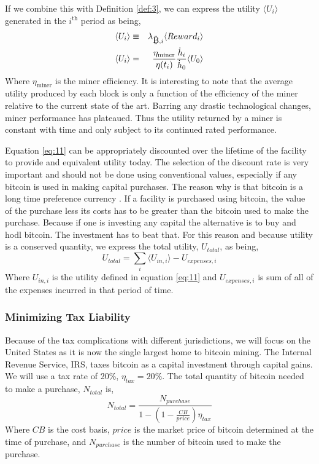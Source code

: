 \documentclass[runningheads]{llncs}
\def\bitcoin{
    \leavevmode
    \vtop{\offinterlineskip %
    \setbox0=\hbox{B}
    \setbox2=\hbox to\wd0{\hfil\hskip-.03em
    \vrule height .3ex width .15ex\hskip .08em
    \vrule height .3ex width .15ex\hfil}
    \vbox{\copy2\box0}\box2}
}
\begin{document}
If we combine this with Definition \ref{def:3}, we can express the utility $\langle U_i \rangle$ generated in the $i^{\mbox{th}}$ period as being,
\begin{eqnarray}
    \langle U_i \rangle &\equiv& \lambda_{\bitcoin, i} \langle Reward_i \rangle \\
    \langle U_i \rangle &=& \frac{\eta_{\mathrm{miner}}}{\eta(t_i)} \frac{\dot{h}_i}{\dot{h}_0} \langle U_0 \rangle \label{eq:11}
\end{eqnarray}
Where $\eta_{\mathrm{miner}}$ is the miner efficiency.
It is interesting to note that the average utility produced by each block is only a function of the efficiency of the miner relative to the current state of the art.
Barring any drastic technological changes, miner performance has plateaued.
Thus the utility returned by a miner is constant with time and only subject to its continued rated performance.

Equation \ref{eq:11} can be appropriately discounted over the lifetime of the facility to provide and equivalent utility today.
The selection of the discount rate is very important and should not be done using conventional values, especially if any bitcoin is used in making capital purchases.
The reason why is that bitcoin is a long time preference currency \cite{ammous2018bitcoin}.
If a facility is purchased using bitcoin, the value of the purchase less its costs has to be greater than the bitcoin used to make the purchase.
Because if one is investing any capital the alternative is to buy and hodl bitcoin.
The investment has to beat that.
For this reason and because utility is a conserved quantity, we express the total utility, $U_{total}$, as being,
\begin{equation}
    U_{total} = \sum_i \langle U_{in,i} \rangle - U_{expenses,i}\label{eq:12}
\end{equation}
Where $U_{in,i}$ is the utility defined in equation \ref{eq:11} and $U_{expenses,i}$ is sum of all of the expenses incurred in that period of time.

\subsubsection{Minimizing Tax Liability}
Because of the tax complications with different jurisdictions, we will focus on the United States as it is now the single largest home to bitcoin mining.
The Internal Revenue Service, IRS, taxes bitcoin as a capital investment through capital gains.
We will use a tax rate of 20\%, $\eta_{tax} = 20\%$.
The total quantity of bitcoin needed to make a purchase, $N_{total}$ is,
\begin{equation}
    N_{total} = \frac{N_{purchase}}{1-(1-\frac{CB}{price})\eta_{tax}}
\end{equation}
Where $CB$ is the cost basis, $price$ is the market price of bitcoin determined at the time of purchase, and $N_{purchase}$ is the number of bitcoin used to make the purchase.
\end{document}
